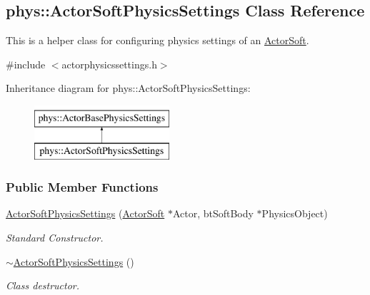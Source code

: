 \hypertarget{classphys_1_1ActorSoftPhysicsSettings}{
\subsection{phys::ActorSoftPhysicsSettings Class Reference}
\label{classphys_1_1ActorSoftPhysicsSettings}
}


This is a helper class for configuring physics settings of an \hyperlink{classphys_1_1ActorSoft}{ActorSoft}.  




{\ttfamily \#include $<$actorphysicssettings.h$>$}

Inheritance diagram for phys::ActorSoftPhysicsSettings:\begin{figure}[H]
\begin{center}
\leavevmode
\includegraphics[height=2.000000cm]{classphys_1_1ActorSoftPhysicsSettings}
\end{center}
\end{figure}
\subsubsection*{Public Member Functions}
\begin{DoxyCompactItemize}
\item 
\hyperlink{classphys_1_1ActorSoftPhysicsSettings_a4b5f0d9f1f4c36b3d429528cfbacf35c}{ActorSoftPhysicsSettings} (\hyperlink{classphys_1_1ActorSoft}{ActorSoft} $\ast$Actor, btSoftBody $\ast$PhysicsObject)
\begin{DoxyCompactList}\small\item\em Standard Constructor. \item\end{DoxyCompactList}\item 
\hypertarget{classphys_1_1ActorSoftPhysicsSettings_a9728c78b1bd9a7c1bc2c35619bc01a4a}{
\hyperlink{classphys_1_1ActorSoftPhysicsSettings_a9728c78b1bd9a7c1bc2c35619bc01a4a}{$\sim$ActorSoftPhysicsSettings} ()}
\label{classphys_1_1ActorSoftPhysicsSettings_a9728c78b1bd9a7c1bc2c35619bc01a4a}

\begin{DoxyCompactList}\small\item\em Class destructor. \item\end{DoxyCompactList}\end{DoxyCompactItemize}

